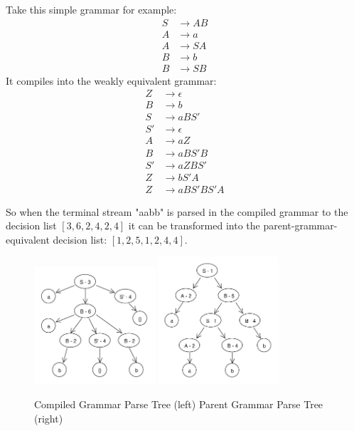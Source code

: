 \documentclass[11pt]{article}
\begin{document}
Take this simple grammar for example:
\setcounter{equation}{0}
\begin{align}
S &\rightarrow A B\\
A &\rightarrow a\\
A &\rightarrow S A\\
B &\rightarrow b\\
B &\rightarrow S B
\end{align}
It compiles into the weakly equivalent grammar:
\setcounter{equation}{0}
\begin{align}
Z &\rightarrow \epsilon\\
B &\rightarrow b\\
S &\rightarrow a B S'\\
S' &\rightarrow \epsilon\\
A &\rightarrow a Z\\
B &\rightarrow a B S' B\\
S' &\rightarrow a Z B S'\\
Z &\rightarrow b S' A\\
Z &\rightarrow a B S' B S' A
\end{align}

So when the terminal stream "aabb" is parsed in the compiled
grammar to the decision list $[3, 6, 2, 4, 2, 4]$ it can be transformed
into the parent-grammar-equivalent decision list: $[1, 2, 5, 1, 2, 4, 4]$.

\begin{figure}[h!]
    \centering
    \includegraphics[width=0.4\textwidth,natwidth=458,natheight=444]{compiled_ex.pdf}
    \includegraphics[width=0.4\textwidth,natwidth=472,natheight=500]{decompiled_ex.pdf}
    \caption{Compiled Grammar Parse Tree (left) Parent Grammar Parse Tree (right)}
    \label{fig:comp_to_dec_ex}
\end{figure}
\end{document}
